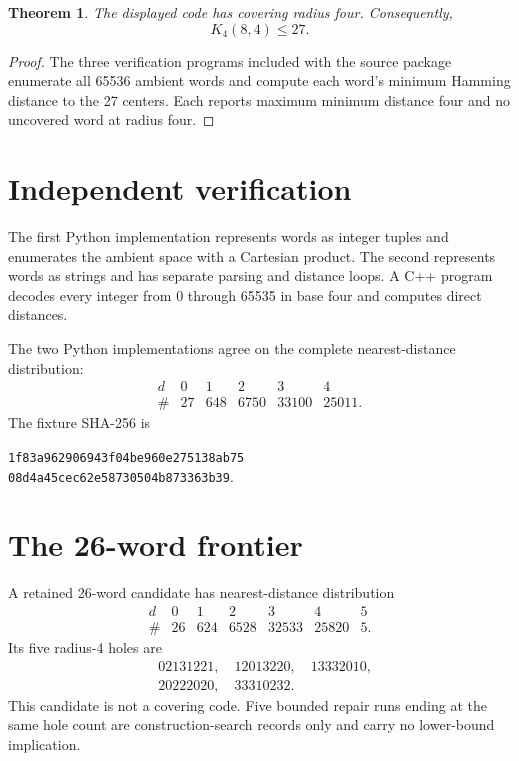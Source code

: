 \documentclass[11pt]{article}
\newtheorem{theorem}{Theorem}
\begin{document}
\begin{theorem}
The displayed code has covering radius four. Consequently,
\[
  K_4(8,4) \leq 27.
\]
\end{theorem}

\begin{proof}
The three verification programs included with the source package enumerate
all 65536 ambient words and compute each word's minimum Hamming distance to
the 27 centers. Each reports maximum minimum distance four and no uncovered
word at radius four.
\end{proof}

\section{Independent verification}

The first Python implementation represents words as integer tuples and
enumerates the ambient space with a Cartesian product. The second represents
words as strings and has separate parsing and distance loops. A C++ program
decodes every integer from 0 through 65535 in base four and computes direct
distances.

The two Python implementations agree on the complete nearest-distance
distribution:
\[
\begin{array}{c|rrrrr}
d & 0 & 1 & 2 & 3 & 4\\
\hline
\# & 27 & 648 & 6750 & 33100 & 25011.
\end{array}
\]
The fixture SHA-256 is
\begin{center}
\texttt{1f83a962906943f04be960e275138ab75}\\
\texttt{08d4a45cec62e58730504b873363b39}.
\end{center}

\section{The 26-word frontier}

A retained 26-word candidate has nearest-distance distribution
\[
\begin{array}{c|rrrrrr}
d & 0 & 1 & 2 & 3 & 4 & 5\\
\hline
\# & 26 & 624 & 6528 & 32533 & 25820 & 5.
\end{array}
\]
Its five radius-4 holes are
\[
\begin{split}
&02131221,\quad 12013220,\quad 13332010,\\
&20222020,\quad 33310232.
\end{split}
\]
This candidate is not a covering code. Five bounded repair runs ending at
the same hole count are construction-search records only and carry no
lower-bound implication.
\end{document}
